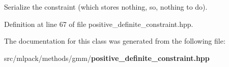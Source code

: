Serialize the constraint (which stores nothing, so, nothing to do). 



Definition at line 67 of file positive\+\_\+definite\+\_\+constraint.\+hpp.



The documentation for this class was generated from the following file\+:\begin{DoxyCompactItemize}
\item 
src/mlpack/methods/gmm/{\bf positive\+\_\+definite\+\_\+constraint.\+hpp}\end{DoxyCompactItemize}
